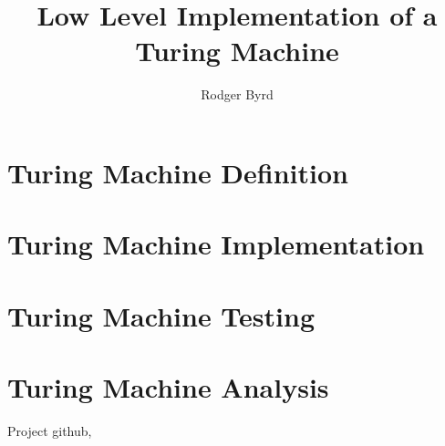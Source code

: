 \documentclass{article}
\begin{document}
\raggedright

\title{Low Level Implementation of a Turing Machine}
\author{Rodger Byrd}
\maketitle

\section{Turing Machine Definition}

\section{Turing Machine Implementation}

\section{Turing Machine Testing}

\section{Turing Machine Analysis}

\begin{thebibliography}{9}
Project github,
\\

\end{thebibliography}
\end{document}
